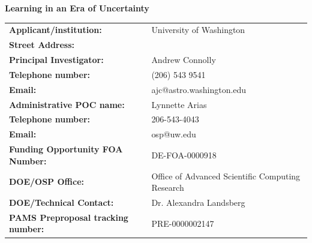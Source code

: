 \documentclass[prd,nofootbib,floatfix,11pt,tightenlines,nofootinbib]{revtex4}
\begin{document}
 

\begin{center}
{\bf \Large Learning in an Era of Uncertainty}
\end{center}

\vspace{1cm}

\noindent
\begin{tabular}{ll}
{\bf Applicant/institution: } & University of Washington\\
{\bf Street Address: } & \\
{\bf Principal Investigator: } &Andrew Connolly \\
{\bf Telephone number: } & (206) 543 9541 \\
{\bf Email: } & ajc@astro.washington.edu \\
{\bf Administrative POC name:} & Lynnette Arias\\
{\bf Telephone number:} & 206-543-4043\\
{\bf Email:} & osp@uw.edu\\
{\bf Funding Opportunity FOA Number:} & DE-FOA-0000918 \\
{\bf DOE/OSP Office: } & Office of Advanced Scientific Computing Research \\
{\bf DOE/Technical Contact: } & Dr. Alexandra Landsberg \\
{\bf PAMS Preproposal tracking number: } & PRE-0000002147 \\
\end{tabular}

\end{document}
